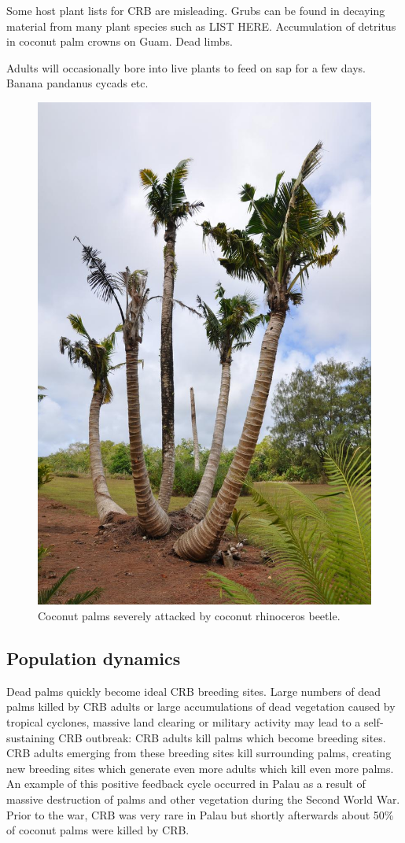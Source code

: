 \documentclass[twocolumn,letterpaper]{scrartcl}
\begin{document}
Some host plant lists for CRB are misleading. Grubs can be found in decaying material from many plant species such as LIST HERE. Accumulation of detritus in coconut palm crowns on Guam. Dead limbs.

Adults will occasionally bore into live plants to feed on sap for a few days. Banana pandanus cycads etc.

\begin{figure}[h]
	\centering
	\includegraphics[width=0.8\linewidth]{images/dying_coconuts}
	\caption{Coconut palms severely attacked by coconut rhinoceros beetle.}
	\label{fig:dyingcoconuts}
\end{figure}

\subsection{Population dynamics}
Dead palms quickly become ideal CRB breeding sites. Large numbers of dead palms killed by CRB adults or  large accumulations of dead vegetation caused by tropical cyclones, massive land clearing or military activity may lead to a self-sustaining  CRB outbreak: CRB adults kill palms which become breeding sites. CRB adults emerging from these breeding sites kill surrounding palms, creating new breeding sites which generate even more adults which kill even more palms. An example of this positive feedback cycle occurred in Palau as a result of massive destruction of palms and other vegetation during the Second World War. Prior to the war, CRB was very rare in Palau but shortly afterwards about 50\% of coconut palms were killed by CRB.
\end{document}
